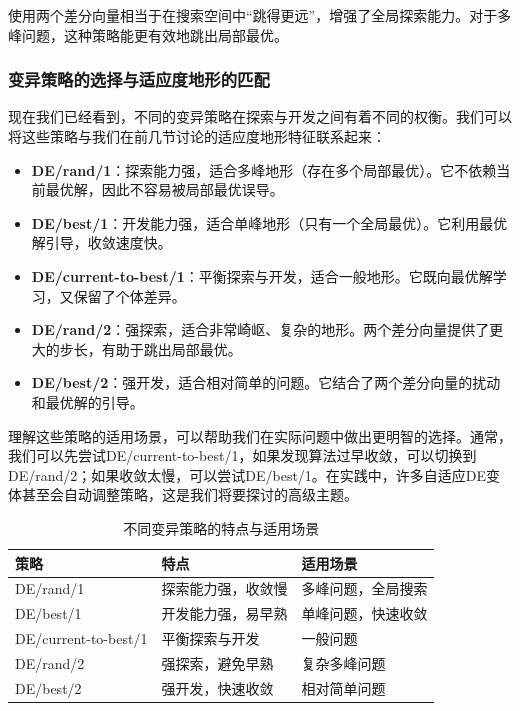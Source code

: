 \documentclass[lang=cn,zihao=-4,a4paper,fontset=windows]{beautybook}
\begin{document}
使用两个差分向量相当于在搜索空间中“跳得更远”，增强了全局探索能力。对于多峰问题，这种策略能更有效地跳出局部最优。

\subsubsection{变异策略的选择与适应度地形的匹配}

现在我们已经看到，不同的变异策略在探索与开发之间有着不同的权衡。我们可以将这些策略与我们在前几节讨论的适应度地形特征联系起来：

\begin{itemize}
    \item \textbf{DE/rand/1}：探索能力强，适合多峰地形（存在多个局部最优）。它不依赖当前最优解，因此不容易被局部最优误导。
    \item \textbf{DE/best/1}：开发能力强，适合单峰地形（只有一个全局最优）。它利用最优解引导，收敛速度快。
    \item \textbf{DE/current-to-best/1}：平衡探索与开发，适合一般地形。它既向最优解学习，又保留了个体差异。
    \item \textbf{DE/rand/2}：强探索，适合非常崎岖、复杂的地形。两个差分向量提供了更大的步长，有助于跳出局部最优。
    \item \textbf{DE/best/2}：强开发，适合相对简单的问题。它结合了两个差分向量的扰动和最优解的引导。
\end{itemize}

理解这些策略的适用场景，可以帮助我们在实际问题中做出更明智的选择。通常，我们可以先尝试DE/current-to-best/1，如果发现算法过早收敛，可以切换到DE/rand/2；如果收敛太慢，可以尝试DE/best/1。在实践中，许多自适应DE变体甚至会自动调整策略，这是我们将要探讨的高级主题。

\begin{table}[h]
\centering
\caption{不同变异策略的特点与适用场景}
\begin{tabular}{p{}p{}p{}}
\toprule
\textbf{策略} & \textbf{特点} & \textbf{适用场景} \\
\midrule
DE/rand/1 & 探索能力强，收敛慢 & 多峰问题，全局搜索 \\
DE/best/1 & 开发能力强，易早熟 & 单峰问题，快速收敛 \\
DE/current-to-best/1 & 平衡探索与开发 & 一般问题 \\
DE/rand/2 & 强探索，避免早熟 & 复杂多峰问题 \\
DE/best/2 & 强开发，快速收敛 & 相对简单问题 \\
\bottomrule
\end{tabular}
\end{table}
\end{document}
